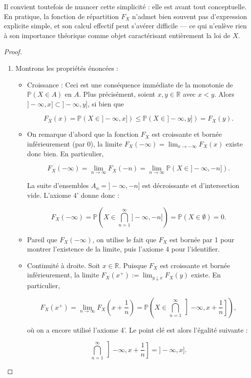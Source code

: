 Il convient toutefois de nuancer cette simplicité : elle est avant tout conceptuelle. En pratique, la fonction de répartition $F_X$ n'admet bien souvent pas d'expression explicite simple, et son calcul effectif peut s'avérer difficile — ce qui n'enlève rien à son importance théorique comme objet caractérisant entièrement la loi de $X$.

\begin{proof}
\begin{enumerate}
\item Montrons les propriétés énoncées :
\begin{itemize}
\item Croissance : Ceci est une conséquence immédiate de la monotonie de $\mathbb{P}(X \in A)$ en $A$. Plus précisément, soient $x, y \in \mathbb{R}$ avec $x < y$. Alors $]-\infty, x] \subset ]-\infty, y]$, si bien que

$$
F_X(x) = \mathbb{P}(X \in ]-\infty, x]) \leq \mathbb{P}(X \in ]-\infty, y]) = F_X(y).
$$
\item On remarque d'abord que la fonction $F_X$ est croissante et bornée inférieurement (par 0), la limite $F_X(-\infty) = \lim_{x \to -\infty} F_X(x)$ existe donc bien. En particulier,

$$
F_X(-\infty) = \lim_{n \to \infty} F_X(-n) = \lim_{n \to \infty} \mathbb{P}(X \in ]-\infty, -n]).
$$

La suite d'ensembles $A_n = ]-\infty, -n]$ est décroissante et d'intersection vide. L'axiome 4' donne donc :

$$
F_X(-\infty) = \mathbb{P}\left(X \in \bigcap_{n=1}^\infty ]-\infty, -n]\right) = \mathbb{P}(X \in \emptyset) = 0.
$$
\item Pareil que $F_X(-\infty)$, on utilise le fait que $F_X$ est bornée par 1 pour montrer l'existence de la limite, puis l'axiome 4 pour l'identifier.
\item Continuité à droite. Soit $x \in \mathbb{R}$. Puisque $F_X$ est croissante et bornée inférieurement, la limite $F_X(x^+) := \lim_{y \downarrow x} F_X(y)$ existe. En particulier,

$$
F_X(x^+) = \lim_{n \to \infty} F_X\left(x + \frac{1}{n}\right) = \mathbb{P}\left(X \in \bigcap_{n=1}^\infty \left]-\infty, x + \frac{1}{n}\right]\right),
$$

où on a encore utilisé l'axiome 4'. Le point clé est alors l'égalité suivante :

$$
\bigcap_{n=1}^\infty \left]-\infty, x + \frac{1}{n}\right] = ]-\infty, x].
$$


\end{itemize}
\end{enumerate}
\end{proof}
